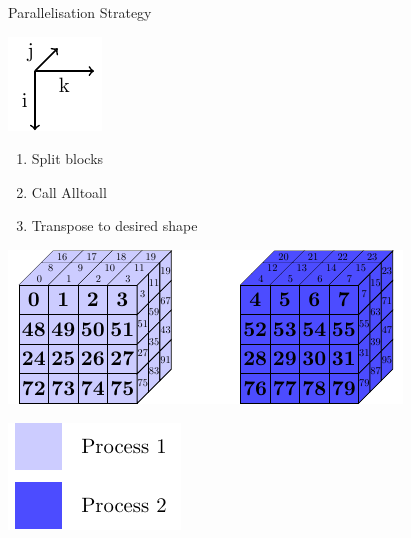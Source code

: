 \documentclass{beamer}
\begin{document}
\begin{frame}{Parallelisation Strategy}
 \begin{minipage}{.3\textwidth}
 \includegraphics[width=.4\textwidth]{SplitConcat3D/Axes}
 \vspace{4em}
 
  \begin{enumerate}
   \item Split blocks 
   \item Call Alltoall
   \item Transpose to desired shape
  \end{enumerate}
  
  \vspace{4em}
 \end{minipage}
 \begin{minipage}{.65\textwidth}
  \includegraphics[width=\textwidth]{SplitConcat3D/WrongBlock}
  
  \vspace{1em}
  
  \hfill\includegraphics[width=.3\textwidth]{SplitConcat3D/Legend}
 \end{minipage}
\end{frame}
\end{document}
